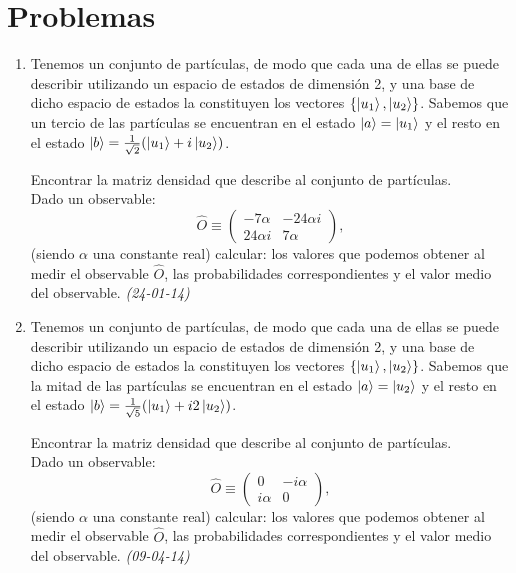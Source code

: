 
\newpage

\section{Problemas}

\begin{enumerate}
    

    \item Tenemos un conjunto de partículas, de modo que cada una de ellas se puede describir utilizando un espacio de estados de dimensión 2, y una base de dicho espacio de estados la constituyen los vectores $\{\ket{u_1}, \ket{u_2}\}$. Sabemos que un tercio de las partículas se encuentran en el estado $\ket{a} = \ket{u_1}$ y el resto en el estado $\ket{b} = \frac{1}{\sqrt{2}} (\ket{u_1} + i \ket{u_2})$.

    Encontrar la matriz densidad que describe al conjunto de partículas. \\
    Dado un observable:
    \[
    \hat{O} \equiv \begin{pmatrix} -7\alpha & -24 \alpha i \\ 24 \alpha i & 7\alpha \end{pmatrix},
    \]
    (siendo $\alpha$ una constante real) calcular: los valores que podemos obtener al medir el observable $\hat{O}$, las probabilidades correspondientes y el valor medio del observable. \textit{(24-01-14)}



    \item Tenemos un conjunto de partículas, de modo que cada una de ellas se puede describir utilizando un espacio de estados de dimensión 2, y una base de dicho espacio de estados la constituyen los vectores $\{\ket{u_1}, \ket{u_2}\}$. Sabemos que la mitad de las partículas se encuentran en el estado $\ket{a} = \ket{u_2}$ y el resto en el estado $\ket{b} = \frac{1}{\sqrt{5}} (\ket{u_1} + i2 \ket{u_2})$.

    Encontrar la matriz densidad que describe al conjunto de partículas. \\
    Dado un observable:
    \[
    \hat{O} \equiv \begin{pmatrix} 0 & -i \alpha \\ i \alpha & 0 \end{pmatrix},
    \]
    (siendo $\alpha$ una constante real) calcular: los valores que podemos obtener al medir el observable $\hat{O}$, las probabilidades correspondientes y el valor medio del observable. \textit{(09-04-14)}



\end{enumerate}
